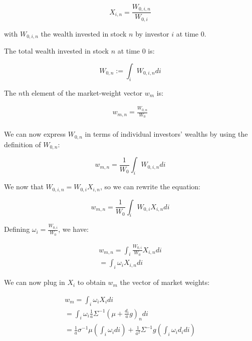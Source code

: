 \begin{equation}
    X_{i,n} = \frac{W_{0,i,n}}{W_{0,i}}
\end{equation}

with $W_{0,i,n}$ the wealth invested in stock $n$ by investor $i$ at time 0.

The total wealth invested in stock $n$ at time 0 is:

\begin{equation}
    W_{0,n} := \int_i W_{0,i,n} di
\end{equation}

The $n$th element of the market-weight vector $w_m$ is:

\begin{equation}
    \begin{aligned}
    w_{m,n} = \frac{W_{0,n}}{W_{0}} \\
    \end{aligned}
\end{equation}

We can now express $W_{0,n}$ in terms of individual investors' wealths
by using the definition of $W_{0,n}$:

\begin{equation}
    w_{m,n} = \frac{1}{W_0} \int_i W_{0,i,n} di
\end{equation}

We now that $W_{0,i,n} = W_{0,i} X_{i,n}$, so we can rewrite the equation:

\begin{equation}
    w_{m,n} = \frac{1}{W_0} \int_i W_{0,i} X_{i,n} di
\end{equation}

Defining $\omega_i = \frac{W_{0,i}}{W_0}$, we have:

\begin{equation}
    \begin{aligned}
    w_{m,n} = \int_i \frac{W_{0,i}}{W_0} X_{i,n} di\\
    = \int_i \omega_i X_{i,n} di
    \end{aligned}
\end{equation}

We can now plug in $X_i$ to obtain $w_m$ the vector 
of market weights: 

\begin{equation}
    \begin{aligned}
    w_{m} = \int_i \omega_i X_i di \\ 
     = \int_i \omega_i \frac{1}{a} \Sigma^{-1}(\mu + \frac{d_i}{a}g)_n di \\
     = \frac{1}{a} \sigma^{-1} \mu (\int_i \omega_i di) + \frac{1}{a^2} \Sigma^{-1} g (\int_i \omega_i d_i di)
    \end{aligned}
\end{equation}


